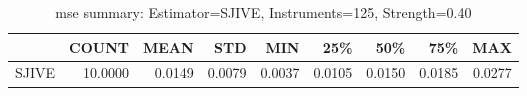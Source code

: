 \begin{table}[ht]
\centering
\caption{mse summary: Estimator=SJIVE, Instruments=125, Strength=0.40}
\begin{tabular}{lrrrrrrrr}
\toprule
 & COUNT & MEAN & STD & MIN & 25\% & 50\% & 75\% & MAX \\
\midrule
SJIVE & 10.0000 & 0.0149 & 0.0079 & 0.0037 & 0.0105 & 0.0150 & 0.0185 & 0.0277 \\
\bottomrule
\end{tabular}
\end{table}
